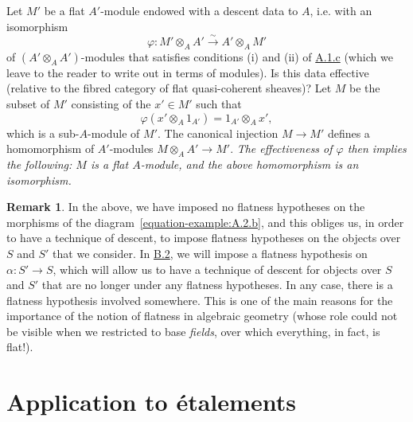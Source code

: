 \documentclass{article}
\theoremstyle{plain}
\theoremstyle{definition}
\newtheorem*{remark*}{Remark}
\newcommand{\oldpage}[1]{\marginpar{\footnotesize$\Big\vert$ \textit{p.~#1}}}
\begin{document}
Let $M'$ be a flat $A'$-module endowed with a descent data to $A$, i.e. with an isomorphism
\[
  \varphi\colon M'\otimes_A A' \xrightarrow{\sim} A'\otimes_A M'
\]
of $(A'\otimes_A A')$-modules that satisfies conditions (i) and (ii) of \hyperref[A.1.c]{A.1.c} (which we leave to the reader to write out in terms of modules).
Is this data effective (relative to the fibred category of flat quasi-coherent sheaves)?
Let $M$ be the subset of $M'$ consisting of the $x'\in M'$ such that
\[
  \varphi(x'\otimes_A 1_{A'}) = 1_{A'}\otimes_A x',
\]
which is a sub-$A$-module of $M'$.
The canonical injection $M\to M'$ defines a homomorphism of $A'$-modules $M\otimes_A A'\to M'$.
\emph{The effectiveness of $\varphi$ then implies the following: $M$ is a flat $A$-module, and the above homomorphism is an isomorphism.}

\begin{remark*}
  In the above, we have imposed no flatness hypotheses on the morphisms of the diagram~\cref{equation-example:A.2.b}, and this obliges us, in order to have a technique of descent, to impose flatness hypotheses on the objects over $S$ and $S'$ that we consider.
  In \hyperref[B.2]{B.2}, we will impose a flatness hypothesis on $\alpha\colon S'\to S$, which will allow us to have a technique of descent for objects over $S$ and $S'$ that are no longer under any flatness hypotheses.
  In any case, there is a flatness hypothesis involved somewhere.
  This is one of the main reasons for the importance of the notion of flatness in algebraic geometry (whose role could not be visible when we restricted to base \emph{fields}, over which everything, in fact, is flat!).
\end{remark*}


\oldpage{190-10}
\section{Application to \'{e}talements}
\label{A.3}
\end{document}
